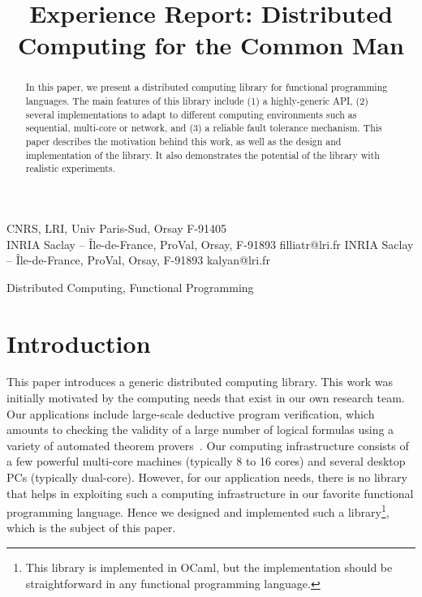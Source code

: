 \documentclass[preprint]{sigplanconf}
\newcommand{\Ocaml}{OCaml}
\begin{document}
\copyrightdata{[to be supplied]} 


\title{Experience Report: Distributed Computing for the Common Man}

           {CNRS, LRI, Univ Paris-Sud, Orsay F-91405\\
            INRIA Saclay -- \^Ile-de-France, ProVal, Orsay, F-91893}
           {filliatr@lri.fr}
           {INRIA Saclay -- \^Ile-de-France, ProVal, Orsay, F-91893}
           {kalyan@lri.fr}

\maketitle

\begin{abstract}
  In this paper, we present a distributed computing library for
  functional programming languages. The main features of this library
  include (1) a highly-generic API, (2) several implementations to
  adapt to different computing environments such as sequential,
  multi-core or network, and (3) a reliable fault tolerance mechanism.
  This paper describes the motivation behind this work, as well as
  the design and implementation of the library. It also demonstrates
  the potential of the library with realistic experiments.
\end{abstract}


\terms
Distributed Computing, Functional Programming


\section{Introduction}

This paper introduces a generic distributed computing library. This
work was initially motivated by the computing needs that exist in our
own research team. Our applications include large-scale deductive
program verification, which amounts to checking the validity of a
large number of logical formulas using a variety of automated theorem
provers~\cite{filliatre07cav}. Our computing infrastructure consists
of a few powerful multi-core machines (typically 8 to 16 cores) and
several desktop PCs (typically dual-core). However, for our
application needs, there is no library that helps in exploiting such a
computing infrastructure in our favorite functional programming
language.  Hence we designed and implemented such a
library\footnote{This library is implemented in \Ocaml, but the
  implementation should be straightforward in any functional
  programming language.}, which is the subject of this paper.
\end{document}
